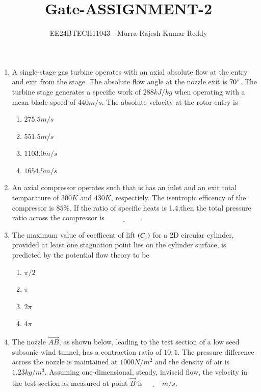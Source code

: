 \documentclass[journal,12pt,onecolumn,article]{IEEEtran}
\theoremstyle{remark}
\begin{document}

\vspace{3cm}
\title{Gate-ASSIGNMENT-2}
\author{EE24BTECH11043 - Murra Rajesh Kumar Reddy}
\maketitle
\bigskip
\begin{enumerate}
	\item A single-stage gas turbine operates with an axial absolute flow at the entry and exit from the stage. The absolute flow angle at the nozzle exit is $70 \degree$. The turbine stage generates a specific work of $288 kJ/kg$ when operating with a mean blade speed of $440m/s$. The absolute velocity at the rotor entry is
		\begin{enumerate}
			\item $275.5 m/s$
			\item $551.5 m/s$
			\item $1103.0 m/s$
			\item $1654.5 m/s$
		\end{enumerate}
	\item An axial compressor operates such that is has an inlet and an exit total temparature of $300 K$ and $430 K$, respectiely. The isentropic efficency of the compressor is $85 \%$. If the ratio of specific heats is 1.4,then the total pressure ratio across the compressor is $\underline{\hspace{2cm}}$.
	\item The maximum value of coefficent of lift $\left(C_1\right)$ for a 2D circular cylinder, provided at least one stagnation point lies on the cylinder surface, is predicted by the potential flow theory to be
		\begin{enumerate}
			\item $\pi/2$
			\item $\pi$
			\item $2\pi$
			\item $4\pi$
		\end{enumerate}
	\item The nozzle $\vec{AB}$, as shown below, leading to the test section of a low seed subsonic wind tunnel, has a contraction ratio of $10 : 1$. The pressure difference across the nozzle is maintained at $1000 N/m^2$ and the density of air is $1.23 kg/m^3$. Assuming one-dimensional, steady, inviscid flow, the velocity in the test section as measured at point $\vec{B}$ is $\underline{\hspace{1cm}} m/s$. \\

\end{enumerate}
\end{document}
